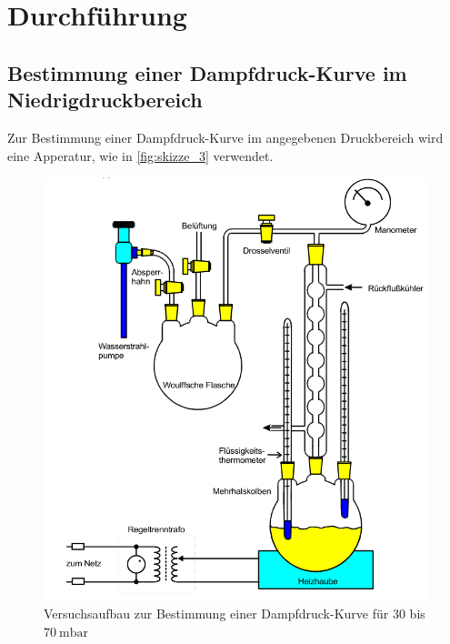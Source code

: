 \section{Durchführung}
\label{sec:Durchführung}


\subsection{Bestimmung einer Dampfdruck-Kurve im Niedrigdruckbereich}
\label{sec:Durchführung_niedrigdruck}

Zur Bestimmung einer Dampfdruck-Kurve im angegebenen Druckbereich wird eine Apperatur, wie in \autoref{fig:skizze_3} verwendet.

\begin{figure}
    \centering
    \includegraphics[width=\textwidth/2]{images/bild3.png}
    \caption{Versuchsaufbau zur Bestimmung einer Dampfdruck-Kurve für $30$ bis $\SI{70}{\milli\bar}$ \cite{V203}}
    \label{fig:skizze_3}
\end{figure}

